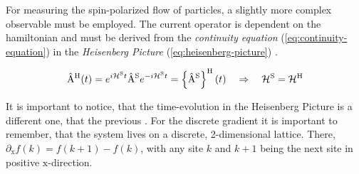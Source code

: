 
For measuring the spin-polarized flow of particles, a slightly more complex observable must be employed. 
The current operator is dependent on the hamiltonian and must be derived from the \emph{continuity equation} (\autoref{eq:continuity-equation}) in the \emph{Heisenberg Picture} (\autoref{eq:heisenberg-picture}) \cite{discreteDivergenceAndOtherCurrentDerivation}.

\begin{equation}
    \label{eq:heisenberg-picture}
    \begin{split}
        \AopOfT[\heisenbergPicture] &= e^{i \pictureHamiltonian[\schroedingerPicture]{} t} \Aop[\schroedingerPicture] e^{-i \pictureHamiltonian[\schroedingerPicture]{} t}
        =  \heisenbergTimeEvolution{\Aop[\schroedingerPicture]}
        \quad \Rightarrow \quad 
        \pictureHamiltonian[\schroedingerPicture]{} = \pictureHamiltonian[\heisenbergPicture]{}\\
    \end{split}
\end{equation}

It is important to notice, that the time-evolution in the Heisenberg Picture \heisenbergTimeEvolution{\ast} is a different one, that the previous \interactionTimeEvolution{\ast}.
For the discrete gradient \discreteGradient it is important to remember, that the system lives on a discrete, 2-dimensional lattice.
There, $\partial_\text{x} f(k) = f(k+1) - f(k)$, with any site $k$ and $k+1$ being the \glqq{}next\grqq{} site in positive $\text{x}$-direction.

